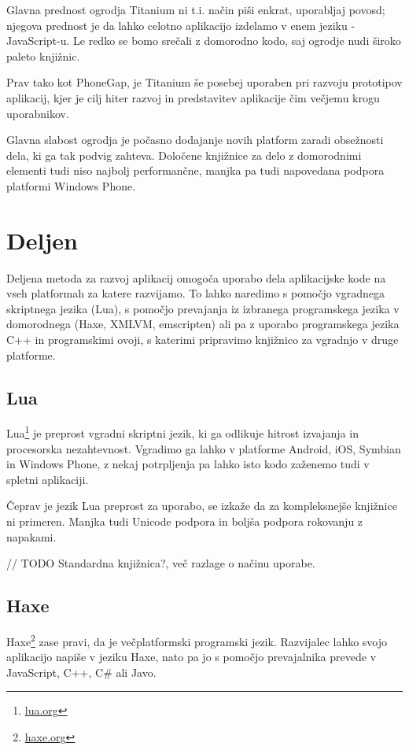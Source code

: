 Glavna prednost ogrodja Titanium ni t.i. način piši enkrat, uporabljaj povosd; njegova prednost je da lahko celotno aplikacijo izdelamo v enem jeziku - JavaScript-u. Le redko se bomo srečali z domorodno kodo, saj ogrodje nudi široko paleto knjižnic.

Prav tako kot PhoneGap, je Titanium še posebej uporaben pri razvoju prototipov aplikacij, kjer je cilj hiter razvoj in predstavitev aplikacije čim večjemu krogu uporabnikov.

Glavna slabost ogrodja je počasno dodajanje novih platform zaradi obsežnosti dela, ki ga tak podvig zahteva. Določene knjižnice za delo z domorodnimi elementi tudi niso najbolj performančne, manjka pa tudi napovedana podpora platformi Windows Phone.

\section{Deljen}

Deljena metoda za razvoj aplikacij omogoča uporabo dela aplikacijske kode na vseh platformah za katere razvijamo. To lahko naredimo s pomočjo vgradnega skriptnega jezika (Lua), s pomočjo prevajanja iz izbranega programskega jezika v domorodnega (Haxe, XMLVM, emscripten) ali pa z uporabo programskega jezika C++ in programskimi ovoji, s katerimi pripravimo knjižnico za vgradnjo v druge platforme.

\subsection{Lua}

Lua\footnote{\href{http://www.lua.org}{lua.org}} je preprost vgradni skriptni jezik, ki ga odlikuje hitrost izvajanja in procesorska nezahtevnost. Vgradimo ga lahko v platforme Android, iOS, Symbian in Windows Phone, z nekaj potrpljenja pa lahko isto kodo zaženemo tudi v spletni aplikaciji.

Čeprav je jezik Lua preprost za uporabo, se izkaže da za kompleksnejše knjižnice ni primeren. Manjka tudi Unicode podpora in boljša podpora rokovanju z napakami.

// TODO Standardna knjižnica?, več razlage o načinu uporabe.

\subsection{Haxe}

Haxe\footnote{\href{http://haxe.org}{haxe.org}} zase pravi, da je večplatformski programski jezik. Razvijalec lahko svojo aplikacijo napiše v jeziku Haxe, nato pa jo s pomočjo prevajalnika prevede v JavaScript, C++, C\# ali Javo.

